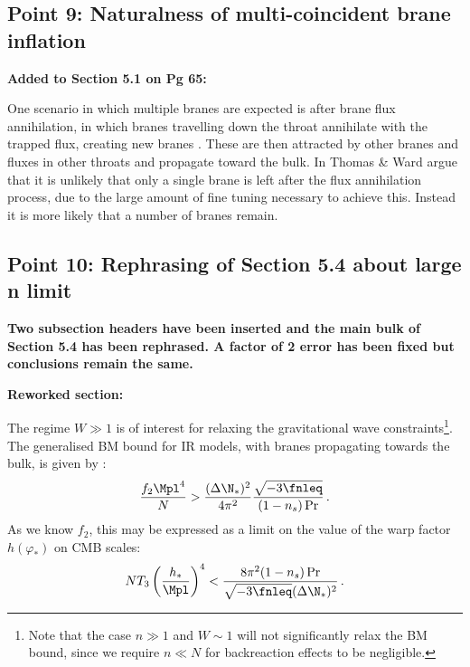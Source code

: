 \subsection{Point 9: Naturalness of multi-coincident brane inflation}
\textbf{Added to Section 5.1 on Pg 65:}

One scenario in which multiple branes are expected is after brane flux annihilation, in which
branes travelling down the throat annihilate with the trapped flux, creating new branes
\cite{thomasward, DeWolfe:2004qx, Kachru:2002gs}. These are then attracted by other branes and
fluxes in other throats and propagate toward the bulk.
In  Thomas \& Ward argue that it is unlikely that only a single brane is left
after the flux annihilation process, due to the large amount of fine tuning necessary to achieve
this. Instead it is more likely that a number of branes remain.

\subsection{Point 10: Rephrasing of Section 5.4 about large n limit}
\textbf{Two subsection headers have been inserted and the main bulk of Section 5.4 has been
rephrased. A factor of 2 error has been fixed but conclusions remain the same.}

\textbf{Reworked section:}

The regime $W \gg 1$ is of interest for 
relaxing the gravitational wave constraints\footnote{Note that 
the case $n \gg 1$ and
$W \sim 1$ will not significantly relax the BM bound, 
since we require $n \ll N$ for backreaction effects to be negligible.}. 
The generalised BM bound for IR models, with branes propagating towards the bulk, is given by 
:
% 
\begin{equation}
\label{eq:f2IRlower-corr}
\frac{f_2\Mpl^4}{N} > \frac{(\Delta \N_*)^2}{4\pi^2}
\frac{\sqrt{-3\fnleq}}{(1-n_s)\Pr}  \,.
\end{equation}
% 
As we know $f_2$, this may be expressed as 
a limit on the value of the warp factor $h(\varphi_*)$ on CMB scales: 
% 
\begin{equation}
\label{eq:warptorelax-corr}
N T_3 \left(\frac{h_*}{\Mpl}\right)^4 < 
\frac{8\pi^2 (1-n_s)\Pr}{\sqrt{-3\fnleq}(\Delta \N_*)^2} \,.
\end{equation}
% 


